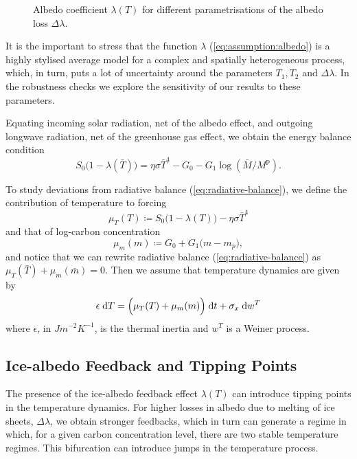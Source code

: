 \documentclass[../../main.tex]{subfiles}
\begin{document}
\begin{figure}[H]
    \centering
    \caption{Albedo coefficient $\lambda(T)$ for different parametrisations of the albedo loss $\Delta \lambda$.}
    \label{fig:albedo_coefficient}
\end{figure}

It is the important to stress that the function $\lambda$ (\ref{eq:assumption:albedo}) is a highly stylised average model for a complex and spatially heterogeneous process, which, in turn, puts a lot of uncertainty around the parameters $T_1, T_2$ and $\Delta \lambda$. In the robustness checks we explore the sensitivity of our results to these parameters.

Equating incoming solar radiation, net of the albedo effect, and outgoing longwave radiation, net of the greenhouse gas effect, we obtain the energy balance condition \begin{equation} \label{eq:radiative-balance}
    S_0 \big(1 - \lambda(\bar{T})\big) = \eta \sigma \bar{T}^4 - G_0 - G_1 \log(\bar{M} / M^{\mathrm{p}}).
\end{equation}

To study deviations from radiative balance (\ref{eq:radiative-balance}), we define the contribution of temperature to forcing \begin{equation} \label{eq:forcing:temperature}
    \mu_T(T) \coloneqq S_0 \big(1 - \lambda(T)\big) - \eta \sigma \bar{T}^4
\end{equation} and that of log-carbon concentration \begin{equation} \label{eq:forcing:concentration}
    \mu_m(m) \coloneqq  G_0 + G_1  \big(m - m_p \big),
\end{equation} and notice that we can rewrite radiative balance (\ref{eq:radiative-balance}) as $\mu_T(\bar{T}) + \mu_m(\bar{m}) = 0$. Then we assume that temperature dynamics are given by \begin{equation} \label{eq:dynamics:x}
    \epsilon \; \mathrm{d}T = \Big(\mu_T(T) + \mu_m(m)\Big) \; \mathrm{d}t + \sigma_x \; \mathrm{d}w^T
\end{equation} where $\epsilon$, in $\unit{J} \unit{m}^{-2} \unit{K}^{-1}$, is the thermal inertia and $w^T$ is a Weiner process.

\subsection{Ice-albedo Feedback and Tipping Points}

The presence of the ice-albedo feedback effect $\lambda(T)$ can introduce tipping points in the temperature dynamics. For higher losses in albedo due to melting of ice sheets, $\Delta \lambda$, we obtain stronger feedbacks, which in turn can generate a regime in which, for a given carbon concentration level, there are two stable temperature regimes. This bifurcation can introduce jumps in the temperature process. 
\end{document}
